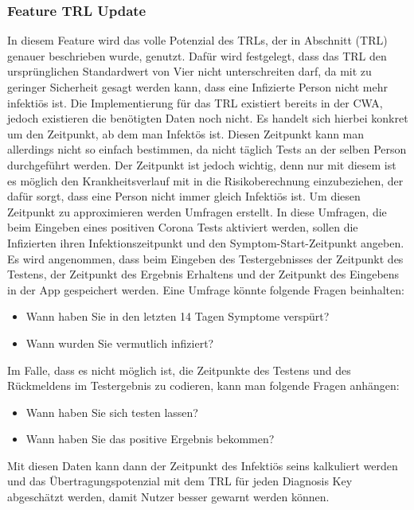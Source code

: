 \documentclass[conference]{IEEEtran}
\begin{document}
\subsubsection{Feature TRL Update}
In diesem Feature wird das volle Potenzial des TRLs, der in Abschnitt (TRL) genauer beschrieben wurde, genutzt. Dafür wird festgelegt, dass das TRL den ursprünglichen Standardwert von Vier nicht unterschreiten darf,
da mit zu geringer Sicherheit gesagt werden kann, dass eine Infizierte Person nicht mehr infektiös ist. 
Die Implementierung für das TRL existiert bereits in der CWA, jedoch existieren die benötigten Daten noch nicht.
Es handelt sich hierbei konkret um den Zeitpunkt, ab dem man Infektös ist. 
Diesen Zeitpunkt kann man allerdings nicht so einfach bestimmen, da nicht täglich Tests an der selben Person durchgeführt werden.
Der Zeitpunkt ist jedoch wichtig, denn nur mit diesem ist es möglich den Krankheitsverlauf mit in die Risikoberechnung einzubeziehen,
der dafür sorgt, dass eine Person nicht immer gleich Infektiös ist. 
Um diesen Zeitpunkt zu approximieren werden Umfragen erstellt.  
In diese Umfragen, die beim Eingeben eines positiven Corona Tests aktiviert werden, sollen die Infizierten ihren Infektionszeitpunkt und den Symptom-Start-Zeitpunkt angeben. 
Es wird angenommen, dass beim Eingeben des Testergebnisses der Zeitpunkt des Testens, der Zeitpunkt des Ergebnis Erhaltens und der Zeitpunkt des Eingebens in der App gespeichert werden. 
Eine Umfrage könnte folgende Fragen beinhalten:

\begin{itemize}
	\item Wann haben Sie in den letzten 14 Tagen Symptome verspürt?
	\item Wann wurden Sie vermutlich infiziert?
\end{itemize}

Im Falle, dass es nicht möglich ist, die Zeitpunkte des Testens und des Rückmeldens im Testergebnis zu codieren, kann man folgende Fragen anhängen:

\begin{itemize}
	\item Wann haben Sie sich testen lassen?
	\item Wann haben Sie das positive Ergebnis bekommen?
\end{itemize} 
	
Mit diesen Daten kann dann der Zeitpunkt des Infektiös seins kalkuliert werden und das Übertragungspotenzial mit dem TRL für jeden Diagnosis Key abgeschätzt werden,
 damit Nutzer besser gewarnt werden können.\\
\end{document}
